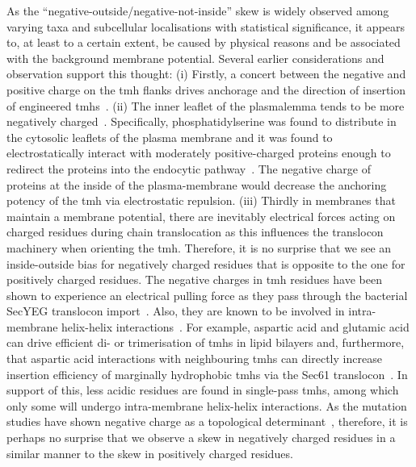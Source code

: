 As the ``negative-outside/negative-not-inside'' skew is widely observed among varying taxa and subcellular localisations with statistical significance, it appears to, at least to a certain extent, be caused by physical reasons and be associated with the background membrane potential.
Several earlier considerations and observation support this thought: (i) Firstly, a concert between the negative and positive charge on the \gls{tmh} flanks drives anchorage and the direction of insertion of engineered \gls{tmh}s~\cite{Sipos1993, Hartmann1989}.
(ii) The inner leaflet of the plasmalemma tends to be more negatively charged~\cite{Zachowski1993}.
Specifically, phosphatidylserine was found to distribute in the cytosolic leaflets of the plasma membrane and it was found to electrostatically interact with moderately positive-charged proteins enough to redirect the proteins into the endocytic pathway~\cite{Yeung2008}.
The negative charge of proteins at the inside of the plasma-membrane would decrease the anchoring potency of the \gls{tmh} via electrostatic repulsion.
(iii) Thirdly in membranes that maintain a membrane potential, there are inevitably electrical forces acting on charged residues during chain translocation as this influences the translocon machinery when orienting the \gls{tmh}.
Therefore, it is no surprise that we see an inside-outside bias for negatively charged residues that is opposite to the one for positively charged residues.
The negative charges in \gls{tmh} residues have been shown to experience an electrical pulling force as they pass through the bacterial SecYEG translocon import~\cite{Ismail2012, Ismail2015}.
Also, they are known to be involved in intra-membrane helix-helix interactions~\cite{Meindl-Beinker2006}.
For example, aspartic acid and glutamic acid can drive efficient di- or trimerisation of \gls{tmh}s in lipid bilayers and, furthermore, that aspartic acid interactions with neighbouring \gls{tmh}s can directly increase insertion efficiency of marginally hydrophobic \gls{tmh}s via the Sec61 translocon~\cite{Meindl-Beinker2006}.
In support of this, less acidic residues are found in single-pass \gls{tmh}s, among which only some will undergo intra-membrane helix-helix interactions.
As the mutation studies have shown negative charge as a topological determinant~\cite{Nilsson1990}, therefore, it is perhaps no surprise that we observe a skew in negatively charged residues in a similar manner to the skew in positively charged residues.

